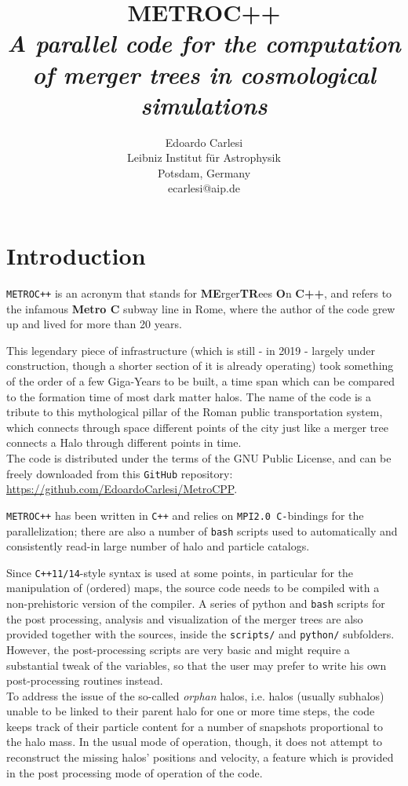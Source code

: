 \documentclass{article}
\title{\textbf{METROC++} \\
\emph{A parallel code for the computation of merger trees in 
cosmological simulations}}
\author{Edoardo Carlesi\\ Leibniz Institut f\"ur Astrophysik\\ Potsdam, Germany\\ ecarlesi@aip.de}
\begin{document}
\maketitle
\tableofcontents
\newpage

\section{Introduction}
\texttt{METROC++} is an acronym that stands for \textbf{ME}rger\textbf{TR}ees \textbf{O}n \textbf{C++}, and refers to the 
infamous \textbf{Metro C} subway line in Rome, where the author of the code grew up and lived for more than 20 years.

This legendary piece of infrastructure (which is still - in 2019 - largely under construction, though a shorter section of 
it is already operating) took something of the order of a few Giga-Years to be built, a time span which can be compared to the
formation time of most dark matter halos. The name of the code is a tribute to this mythological pillar of the Roman public
transportation system, which connects through space different points of the city just like a merger tree connects a Halo 
through different points in time.\\

The code is distributed under the terms of the GNU Public License, and can be freely downloaded from 
this \texttt{GitHub} repository: 
\href{https://github.com/EdoardoCarlesi/MetroCPP}{https://github.com/EdoardoCarlesi/MetroCPP}.

\texttt{METROC++} has been written in \texttt{C++} and relies on \texttt{MPI2.0 C-}bindings for the parallelization; there are
also a number of \texttt{bash} scripts used to automatically and consistently read-in large number of halo and particle catalogs.

Since \texttt{C++11/14}-style syntax is used at some points, in particular for the manipulation
of (ordered) maps, the source code needs to be compiled with a non-prehistoric version of the compiler.
A series of python and \texttt{bash} scripts for the post processing, analysis and visualization of the merger trees are also provided 
together with the sources, inside the \texttt{scripts/} and \texttt{python/} subfolders. 
However, the post-processing scripts are very basic and might require a substantial tweak of the variables, so that the user
may prefer to write his own post-processing routines instead.\\

To address the issue of the so-called \emph{orphan} halos, i.e. halos (usually subhalos) unable to be linked to their parent 
halo for one or more time steps, the code keeps track of their particle content for a number of snapshots proportional to the
halo mass. In the usual mode of operation, though, it does not attempt to reconstruct the missing halos' positions and
velocity, a feature which is provided in the post processing mode of operation of the code.\\
\end{document}
